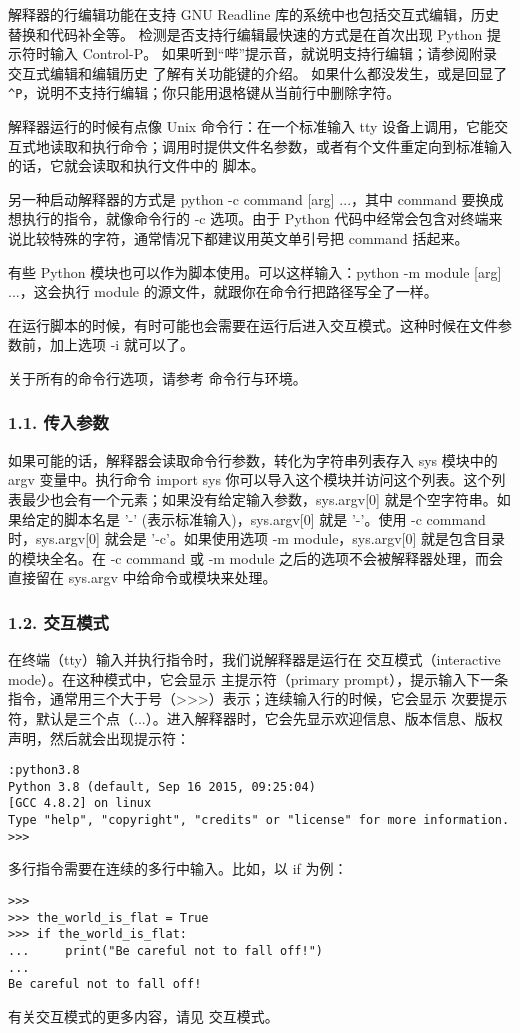 解释器的行编辑功能在支持 GNU Readline 库的系统中也包括交互式编辑，历史替换和代码补全等。 检测是否支持行编辑最快速的方式是在首次出现 Python 提示符时输入 Control-P。 如果听到“哔”提示音，就说明支持行编辑；请参阅附录 交互式编辑和编辑历史 了解有关功能键的介绍。 如果什么都没发生，或是回显了 \verb|^P|，说明不支持行编辑；你只能用退格键从当前行中删除字符。

解释器运行的时候有点像 Unix 命令行：在一个标准输入 tty 设备上调用，它能交互式地读取和执行命令；调用时提供文件名参数，或者有个文件重定向到标准输入的话，它就会读取和执行文件中的 脚本。

另一种启动解释器的方式是 python -c command [arg] ...，其中 command 要换成想执行的指令，就像命令行的 -c 选项。由于 Python 代码中经常会包含对终端来说比较特殊的字符，通常情况下都建议用英文单引号把 command 括起来。

有些 Python 模块也可以作为脚本使用。可以这样输入：python -m module [arg] ...，这会执行 module 的源文件，就跟你在命令行把路径写全了一样。

在运行脚本的时候，有时可能也会需要在运行后进入交互模式。这种时候在文件参数前，加上选项 -i 就可以了。

关于所有的命令行选项，请参考 命令行与环境。

\subsubsection{1.1. 传入参数}
如果可能的话，解释器会读取命令行参数，转化为字符串列表存入 sys 模块中的 argv 变量中。执行命令 import sys 你可以导入这个模块并访问这个列表。这个列表最少也会有一个元素；如果没有给定输入参数，sys.argv[0] 就是个空字符串。如果给定的脚本名是 '-' (表示标准输入)，sys.argv[0] 就是 '-'。使用 -c command 时，sys.argv[0] 就会是 '-c'。如果使用选项 -m module，sys.argv[0] 就是包含目录的模块全名。在 -c command 或 -m module 之后的选项不会被解释器处理，而会直接留在 sys.argv 中给命令或模块来处理。

\subsubsection{1.2. 交互模式}

在终端（tty）输入并执行指令时，我们说解释器是运行在 交互模式（interactive mode）。在这种模式中，它会显示 主提示符（primary prompt），提示输入下一条指令，通常用三个大于号（>>>）表示；连续输入行的时候，它会显示 次要提示符，默认是三个点（...）。进入解释器时，它会先显示欢迎信息、版本信息、版权声明，然后就会出现提示符：

\begin{lstlisting}[language=none]
:python3.8
Python 3.8 (default, Sep 16 2015, 09:25:04)
[GCC 4.8.2] on linux
Type "help", "copyright", "credits" or "license" for more information.
>>>
\end{lstlisting}
多行指令需要在连续的多行中输入。比如，以 if 为例：
\begin{lstlisting}[language=none]
>>>
>>> the_world_is_flat = True
>>> if the_world_is_flat:
...     print("Be careful not to fall off!")
...
Be careful not to fall off!
\end{lstlisting}
有关交互模式的更多内容，请见 交互模式。

